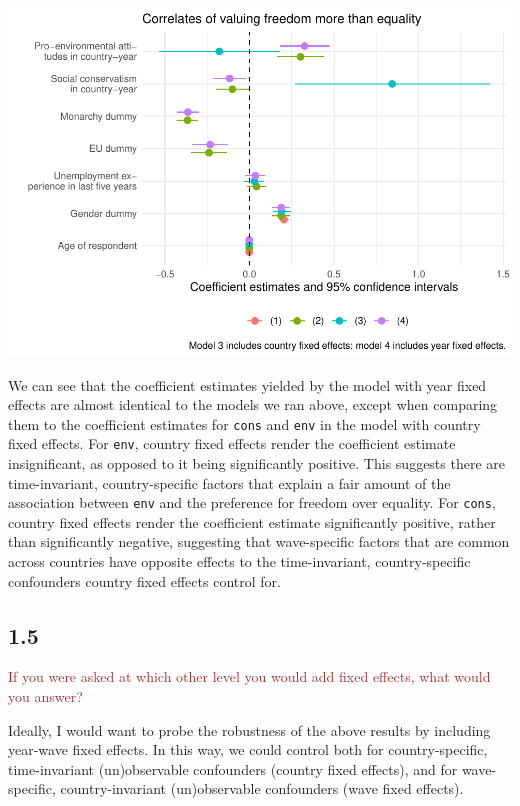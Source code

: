 \documentclass[
]{article}
\begin{document}
\includegraphics{AVCD-Assignment3-Edenhofer_files/figure-latex/year-fe-free-better-1.pdf}

We can see that the coefficient estimates yielded by the model with year
fixed effects are almost identical to the models we ran above, except
when comparing them to the coefficient estimates for \texttt{cons} and
\texttt{env} in the model with country fixed effects. For \texttt{env},
country fixed effects render the coefficient estimate insignificant, as
opposed to it being significantly positive. This suggests there are
time-invariant, country-specific factors that explain a fair amount of
the association between \texttt{env} and the preference for freedom over
equality. For \texttt{cons}, country fixed effects render the
coefficient estimate significantly positive, rather than significantly
negative, suggesting that wave-specific factors that are common across
countries have opposite effects to the time-invariant, country-specific
confounders country fixed effects control for.

\hypertarget{section-4}{%
\subsection{1.5}\label{section-4}}

\textcolor{brown}{If you were asked at which other level you would add fixed effects, what would you answer?}

Ideally, I would want to probe the robustness of the above results by
including year-wave fixed effects. In this way, we could control both
for country-specific, time-invariant (un)observable confounders (country
fixed effects), and for wave-specific, country-invariant (un)observable
confounders (wave fixed effects).
\end{document}
